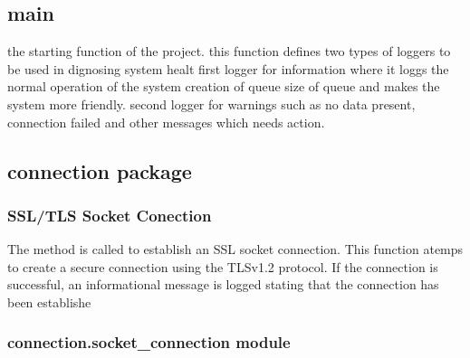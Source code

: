 \documentclass[letterpaper,10pt,english]{sphinxmanual}
\begin{document}
\subsection{main}
\label{\detokenize{main:module-main}}\label{\detokenize{main:main}}\label{\detokenize{main::doc}}

\begin{fulllineitems}
\label{\detokenize{main:main.main}}
\pysigstartsignatures
{}
\pysigstopsignatures
\sphinxAtStartPar
the starting function of the project.
this function defines two types of loggers to be used in dignosing system healt 
first logger for information where it loggs the normal operation of the system creation of queue size of queue
and makes the system more friendly.
second logger for warnings such as no data present, connection failed and other messages which needs action.

\end{fulllineitems}


\sphinxstepscope


\subsection{connection package}
\label{\detokenize{connection:connection-package}}\label{\detokenize{connection::doc}}

\subsubsection{SSL/TLS Socket Conection}
\label{\detokenize{connection:ssl-tls-socket-conection}}
\sphinxAtStartPar
The method  is called to establish an SSL socket connection.
This function atemps to create a secure connection using the TLSv1.2 protocol.
If the connection is successful, an informational message is logged stating that the connection has been establishe


\subsubsection{connection.socket\_connection module}
\label{\detokenize{connection:module-connection.socket_connection}}\label{\detokenize{connection:connection-socket-connection-module}}
\end{document}
